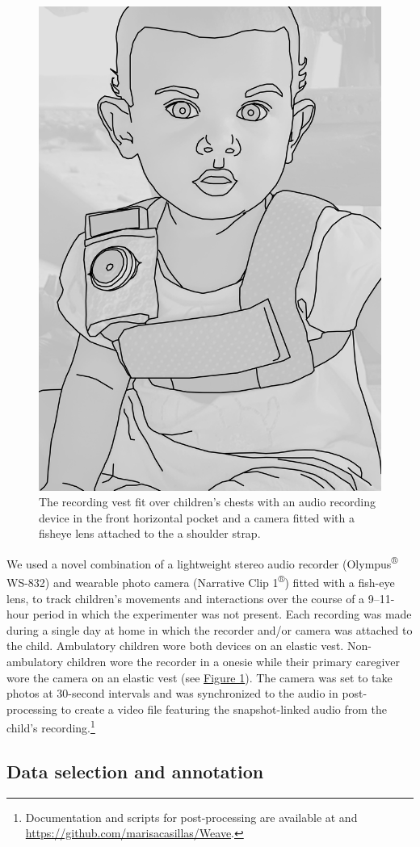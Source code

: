 \documentclass[floatsintext,man]{apa6}
\theoremstyle{definition}
\theoremstyle{definition}
\theoremstyle{definition}
\theoremstyle{remark}
\begin{document}
\begin{figure}

{\centering \includegraphics[width=0.5\linewidth]{Tseltal-CLE_files/TseltalCLE-RecordingVest} 

}

\caption{The recording vest fit over children's chests with an audio recording device in the front horizontal pocket and a camera fitted with a fisheye lens attached to the a shoulder strap.}\label{fig:fig1}
\end{figure}

We used a novel combination of a lightweight stereo audio recorder
(Olympus\textsuperscript{®} WS-832) and wearable photo camera (Narrative
Clip 1\textsuperscript{®}) fitted with a fish-eye lens, to track
children's movements and interactions over the course of a 9--11-hour
period in which the experimenter was not present. Each recording was
made during a single day at home in which the recorder and/or camera was
attached to the child. Ambulatory children wore both devices on an
elastic vest. Non-ambulatory children wore the recorder in a onesie
while their primary caregiver wore the camera on an elastic vest (see
\protect\hyperlink{fig1}{Figure 1}). The camera was set to take photos
at 30-second intervals and was synchronized to the audio in
post-processing to create a video file featuring the snapshot-linked
audio from the child's recording.\footnote{Documentation and scripts for
  post-processing are available at and
  \url{https://github.com/marisacasillas/Weave}.}

\subsection{Data selection and annotation}\label{methods-samples}
\end{document}
